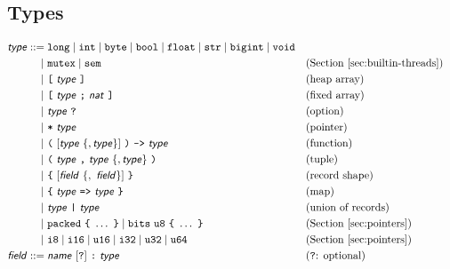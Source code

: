 \subsection{Types}
\label{sec:type-grammar}

\begin{align*}
\ty{type} ::={}& \ic{long} \mid \ic{int} \mid \ic{byte} \mid \ic{bool}
              \mid \ic{float} \mid \ic{str} \mid \ic{bigint} \mid \ic{void} \\
  |~& \ic{mutex} \mid \ic{sem}                   && \text{(Section~\ref{sec:builtin-threads})}\\
  |~& \ic{[}~\ty{type}~\ic{]}                    && \text{(heap array)}\\
  |~& \ic{[}~\ty{type}~\ic{;}~\ty{nat}~\ic{]}   && \text{(fixed array)}\\
  |~& \ty{type}~\ic{?}                           && \text{(option)}\\
  |~& \ic{*}~\ty{type}                           && \text{(pointer)}\\
  |~& \ic{(}~[\ty{type}~\{,\ty{type}\}]~\ic{)}~\ic{->}~\ty{type}
                                                 && \text{(function)}\\
  |~& \ic{(}~\ty{type}~\ic{,}~\ty{type}~\{,\ty{type}\}~\ic{)}
                                                 && \text{(tuple)}\\
  |~& \ic{\{}~[\ty{field}~\{,~\ty{field}\}]~\ic{\}}
                                                 && \text{(record shape)}\\
  |~& \ic{\{}~\ty{type}~\ic{=>}~\ty{type}~\ic{\}}  && \text{(map)}\\
  |~& \ty{type}~\ic{|}~\ty{type}                 && \text{(union of records)}\\
  |~& \ic{packed}~\ic{\{}~\ldots~\ic{\}}
     \mid \ic{bits}~\ic{u8}~\ic{\{}~\ldots~\ic{\}}
                                                 && \text{(Section~\ref{sec:pointers})}\\
  |~& \ic{i8} \mid \ic{i16} \mid \ic{u16} \mid \ic{i32} \mid \ic{u32}
     \mid \ic{u64}                               && \text{(Section~\ref{sec:pointers})}\\
\ty{field} ::={}& \ty{name}~[\ic{?}]~\ic{:}~\ty{type} && \text{(\ic{?}: optional)}
\end{align*}

